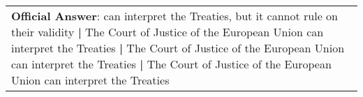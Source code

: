 \begin{figure*}[ht]
{\begin{tabular}{p{}}
            \textbf{Official Answer}: can interpret the Treaties, but it cannot rule on their validity \textbf{|} The Court of Justice of the European Union can interpret the Treaties \textbf{|} The Court of Justice of the European Union can interpret the Treaties \textbf{|} The Court of Justice of the European Union can interpret the Treaties                                                                                                                                                                                                                                                                                                                                                                                                                                                                                                                                                                                                                                                                                                                                                                                                                                                                                                                                                                                                                                                                                                                                                                                                                                                                                                                                                                                                                                                                                                                                                                                                                                                           \\

\end{tabular}}
\end{figure*}
